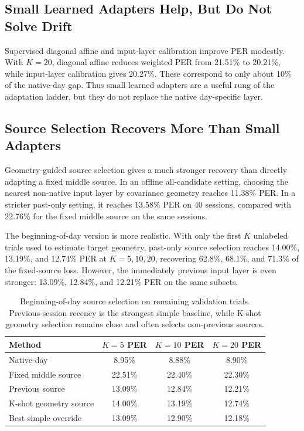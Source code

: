 \documentclass[10pt]{article}
\begin{document}
\subsection{Small Learned Adapters Help, But Do Not Solve Drift}
Supervised diagonal affine and input-layer calibration improve PER modestly.
With $K=20$, diagonal affine reduces weighted PER from 21.51\% to 20.21\%, while
input-layer calibration gives 20.27\%. These correspond to only about 10\% of the
native-day gap. Thus small learned adapters are a useful rung of the adaptation
ladder, but they do not replace the native day-specific layer.

\subsection{Source Selection Recovers More Than Small Adapters}
Geometry-guided source selection gives a much stronger recovery than directly
adapting a fixed middle source. In an offline all-candidate setting, choosing the
nearest non-native input layer by covariance geometry reaches 11.38\% PER. In a
stricter past-only setting, it reaches 13.58\% PER on 40 sessions, compared with
22.76\% for the fixed middle source on the same sessions.

The beginning-of-day version is more realistic. With only the first $K$ unlabeled
trials used to estimate target geometry, past-only source selection reaches
14.00\%, 13.19\%, and 12.74\% PER at $K=5,10,20$, recovering 62.8\%, 68.1\%, and
71.3\% of the fixed-source loss. However, the immediately previous input layer is
even stronger: 13.09\%, 12.84\%, and 12.21\% PER on the same subsets.

\begin{table}[t]
\centering
\caption{Beginning-of-day source selection on remaining validation trials.
Previous-session recency is the strongest simple baseline, while K-shot geometry
selection remains close and often selects non-previous sources.}
\begin{tabular}{lccc}
\toprule
Method & $K=5$ PER & $K=10$ PER & $K=20$ PER \\
\midrule
Native-day & 8.95\% & 8.88\% & 8.90\% \\
Fixed middle source & 22.51\% & 22.40\% & 22.30\% \\
Previous source & 13.09\% & 12.84\% & 12.21\% \\
K-shot geometry source & 14.00\% & 13.19\% & 12.74\% \\
Best simple override & 13.09\% & 12.90\% & 12.18\% \\
\bottomrule
\end{tabular}
\end{table}
\end{document}

